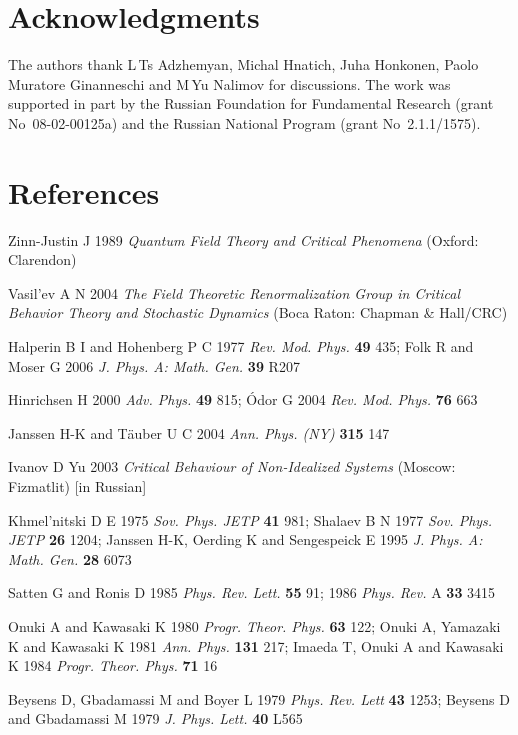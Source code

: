 \documentclass[12pt]{article}
\begin{document}
\section*{Acknowledgments}
The authors thank L\,Ts Adzhemyan, Michal Hnatich, Juha Honkonen,
Paolo Muratore Ginanneschi and M\,Yu Nalimov for discussions.
The work was supported in part by the Russian Foundation for Fundamental
Research (grant No~08-02-00125a) and the Russian National Program
(grant No~2.1.1/1575).


\section*{References}
\begin{thebibliography}{99}

 Zinn-Justin J 1989 {\it Quantum Field Theory and Critical
Phenomena} (Oxford: Clarendon)

 Vasil'ev A N 2004 {\it The Field Theoretic Renormalization
Group in Critical Behavior Theory and Stochastic Dynamics}
(Boca Raton: Chapman \& Hall/CRC)

 Halperin B I and Hohenberg P C 1977 {\it Rev. Mod. Phys.}
{\bf 49} 435; Folk R and Moser G 2006 {\it J. Phys. A: Math. Gen.}
{\bf 39} R207

 Hinrichsen H 2000 {\it Adv. Phys.} {\bf 49} 815;
 \'Odor G 2004 {\it Rev. Mod. Phys.} {\bf 76} 663

 Janssen H-K and T\"{a}uber U C 2004 {\it Ann. Phys. (NY)}
{\bf 315} 147

 Ivanov D Yu 2003 {\it Critical Behaviour of
Non-Idealized Systems} (Moscow: Fizmatlit) [in Russian]

 Khmel'nitski D E 1975 {\it Sov. Phys. JETP} {\bf 41} 981;
Shalaev B N 1977 {\it Sov. Phys. JETP} {\bf 26} 1204;
Janssen H-K, Oerding K and Sengespeick E 1995
{\it J. Phys. A: Math. Gen.} {\bf 28} 6073

 Satten G and Ronis D 1985 {\it Phys. Rev. Lett.}
{\bf 55} 91; 1986 {\it Phys. Rev.} A {\bf 33} 3415

 Onuki A and Kawasaki K 1980 {\it Progr. Theor. Phys.}
{\bf 63} 122;
Onuki A, Yamazaki K and Kawasaki K 1981 {\it Ann. Phys.} {\bf 131} 217;
Imaeda T, Onuki A and Kawasaki K 1984 {\it Progr. Theor. Phys.} {\bf 71} 16

 Beysens D, Gbadamassi M and Boyer L 1979
{\it Phys. Rev. Lett} {\bf 43} 1253;
Beysens D and Gbadamassi M 1979 {\it J. Phys. Lett.} {\bf 40} L565


\end{thebibliography}
\end{document}
